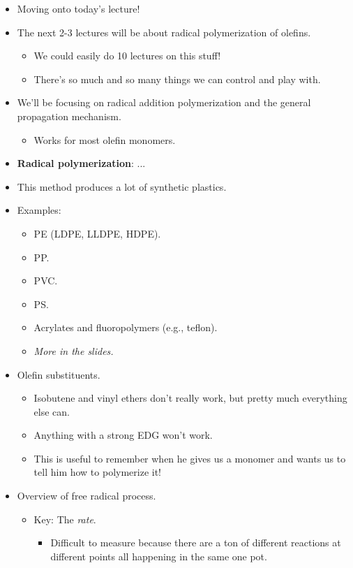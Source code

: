 \documentclass[../notes.tex]{subfiles}
\begin{document}
\begin{itemize}
    \item Moving onto today's lecture!
    \item The next 2-3 lectures will be about radical polymerization of olefins.
    \begin{itemize}
        \item We could easily do 10 lectures on this stuff!
        \item There's so much and so many things we can control and play with.
    \end{itemize}
    \item We'll be focusing on radical addition polymerization and the general propagation mechanism.
    \begin{itemize}
        \item Works for most olefin monomers.
    \end{itemize}
    \item \textbf{Radical polymerization}: ...
    \item This method produces a lot of synthetic plastics.
    \item Examples:
    \begin{itemize}
        \item PE (LDPE, LLDPE, HDPE).
        \item PP.
        \item PVC.
        \item PS.
        \item Acrylates and fluoropolymers (e.g., teflon).
        \item \emph{More in the slides.}
    \end{itemize}
    \item Olefin substituents.
    \begin{itemize}
        \item Isobutene and vinyl ethers don't really work, but pretty much everything else can.
        \item Anything with a strong EDG won't work.
        \item This is useful to remember when he gives us a monomer and wants us to tell him how to polymerize it!
    \end{itemize}
    \item Overview of free radical process.
    \begin{itemize}
        \item Key: The \emph{rate}.
        \begin{itemize}
            \item Difficult to measure because there are a ton of different reactions at different points all happening in the same one pot.

\end{itemize}
\end{itemize}
\end{itemize}
\end{document}
